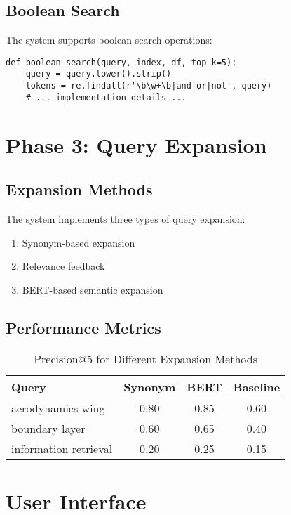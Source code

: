 \documentclass[12pt,a4paper]{article}
\begin{document}
\subsection{Boolean Search}
The system supports boolean search operations:

\begin{verbatim}
def boolean_search(query, index, df, top_k=5):
    query = query.lower().strip()
    tokens = re.findall(r'\b\w+\b|and|or|not', query)
    # ... implementation details ...
\end{verbatim}

\section{Phase 3: Query Expansion}
\subsection{Expansion Methods}
The system implements three types of query expansion:

\begin{enumerate}
    \item Synonym-based expansion
    \item Relevance feedback
    \item BERT-based semantic expansion
\end{enumerate}

\subsection{Performance Metrics}
\begin{table}[H]
    \centering
    \begin{tabular}{lccc}
        \toprule
        \textbf{Query} & \textbf{Synonym} & \textbf{BERT} & \textbf{Baseline} \\
        \midrule
        aerodynamics wing & 0.80 & 0.85 & 0.60 \\
        boundary layer & 0.60 & 0.65 & 0.40 \\
        information retrieval & 0.20 & 0.25 & 0.15 \\
        \bottomrule
    \end{tabular}
    \caption{Precision@5 for Different Expansion Methods}
\end{table}

\section{User Interface}
\end{document}
